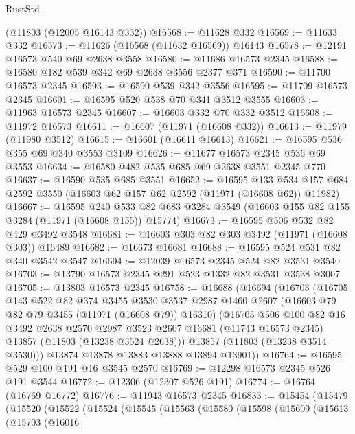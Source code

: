 \begin{lexlean}{RustStd}
\begin{coremodule}
    (@11803 (@12005 @16143 @332))
@16568 := @11628 @332
@16569 := @11633 @332
@16573 := @11626 (@16568 (@11632 @16569)) @16143
@16578 := @12191 @16573 @540 @69 @2638 @3558
@16580 := @11686 @16573 @2345
@16588 := @16580 @182 @539 @342 @69 @2638 @3556 @2377 @371
@16590 := @11700 @16573 @2345
@16593 := @16590 @539 @342 @3556
@16595 := @11709 @16573 @2345
@16601 := @16595 @520 @538 @70 @341 @3512 @3555
@16603 := @11963 @16573 @2345
@16607 := @16603 @332 @70 @332 @3512
@16608 := @11972 @16573
@16611 := @16607 (@11971 (@16608 @332))
@16613 := @11979 (@11980 @3512)
@16615 := @16601 (@16611 @16613)
@16621 := @16595 @536 @355 @69 @340 @3553 @3109
@16626 := @11677 @16573 @2345 @536 @69 @3553
@16634 := @16580 @482 @535 @685 @69 @2638 @3551 @2345 @770
@16637 := @16590 @535 @685 @3551
@16652 := @16595
    @133
    @534
    @157
    @684
    @2592
    @3550
    (@16603 @62 @157 @62 @2592 (@11971 (@16608 @62)) @11982)
@16667 := @16595
    @240
    @533
    @82
    @683
    @3284
    @3549
    (@16603 @155 @82 @155 @3284 (@11971 (@16608 @155)) @15774)
@16673 := @16595 @506 @532 @82 @429 @3492 @3548
@16681 := @16603 @303 @82 @303 @3492 (@11971 (@16608 @303)) @16489
@16682 := @16673 @16681
@16688 := @16595 @524 @531 @82 @340 @3542 @3547
@16694 := @12039 @16573 @2345 @524 @82 @3531 @3540
@16703 := @13790 @16573 @2345 @291 @523 @1332 @82 @3531 @3538 @3007
@16705 := @13803 @16573 @2345
@16758 := @16688
    (@16694
      (@16703
        (@16705
          @143
          @522
          @82
          @374
          @3455
          @3530
          @3537
          @2987
          @1460
          @2607
          (@16603 @79 @82 @79 @3455 (@11971 (@16608 @79)) @16310)
          (@16705
            @506
            @100
            @82
            @16
            @3492
            @2638
            @2570
            @2987
            @3523
            @2607
            @16681
            (@11743 @16573 @2345)
            @13857
            (@11803 (@13238 @3524 @2638)))
          @13857
          (@11803 (@13238 @3514 @3530)))
        @13874
        @13878
        @13883
        @13888
        @13894
        @13901))
@16764 := @16595 @529 @100 @191 @16 @3545 @2570
@16769 := @12298 @16573 @2345 @526 @191 @3544
@16772 := @12306 (@12307 @526 @191)
@16774 := @16764 (@16769 @16772)
@16776 := @11943 @16573 @2345
@16833 := @15454
    (@15479
      (@15520
        (@15522
          (@15524
            (@15545
              (@15563
                (@15580
                  (@15598
                    (@15609
                      (@15613
                        (@15703
                          (@16016

\end{coremodule}
\end{lexlean}
